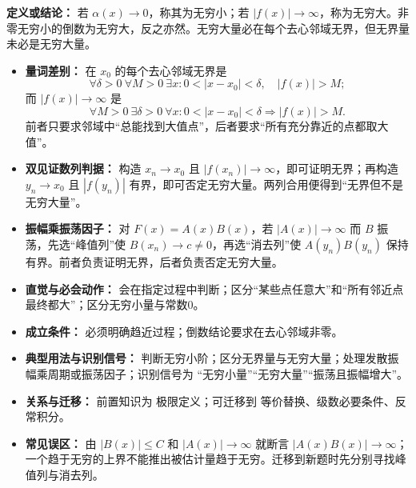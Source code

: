 \begin{knowledgeBox}
\textbf{定义或结论：} 若 $\alpha(x)\to0$，称其为无穷小；若 $|f(x)|\to\infty$，称为无穷大。非零无穷小的倒数为无穷大，反之亦然。无穷大量必在每个去心邻域无界，但无界量未必是无穷大量。

\begin{itemize}
  \item \textbf{量词差别：} 在 \(x_0\) 的每个去心邻域无界是
  \[
    \forall\delta>0\ \forall M>0\ \exists x:
    0<|x-x_0|<\delta,\quad |f(x)|>M;
  \]
  而 \(|f(x)|\to\infty\) 是
  \[
    \forall M>0\ \exists\delta>0\ \forall x:
    0<|x-x_0|<\delta\Longrightarrow |f(x)|>M.
  \]
  前者只要求邻域中“总能找到大值点”，后者要求“所有充分靠近的点都取大值”。
  \item \textbf{双见证数列判据：} 构造 \(x_n\to x_0\) 且 \(|f(x_n)|\to\infty\)，即可证明无界；再构造 \(y_n\to x_0\) 且 \(|f(y_n)|\) 有界，即可否定无穷大量。两列合用便得到“无界但不是无穷大量”。
  \item \textbf{振幅乘振荡因子：} 对 \(F(x)=A(x)B(x)\)，若 \(|A(x)|\to\infty\) 而 \(B\) 振荡，先选“峰值列”使 \(B(x_n)\to c\ne0\)，再选“消去列”使 \(A(y_n)B(y_n)\) 保持有界。前者负责证明无界，后者负责否定无穷大量。
  \item \textbf{直觉与必会动作：} 会在指定过程中判断；区分“某些点任意大”和“所有邻近点最终都大”；区分无穷小量与常数0。
  \item \textbf{成立条件：} 必须明确趋近过程；倒数结论要求在去心邻域非零。
  \item \textbf{典型用法与识别信号：} 判断无穷小阶；区分无界量与无穷大量；处理发散振幅乘周期或振荡因子；识别信号为 “无穷小量”“无穷大量”“振荡且振幅增大”。
  \item \textbf{关系与迁移：} 前置知识为 极限定义；可迁移到 等价替换、级数必要条件、反常积分。
  \item \textbf{常见误区：} 由 \(|B(x)|\le C\) 和 \(|A(x)|\to\infty\) 就断言 \(|A(x)B(x)|\to\infty\)；一个趋于无穷的上界不能推出被估计量趋于无穷。迁移到新题时先分别寻找峰值列与消去列。
\end{itemize}
\end{knowledgeBox}


